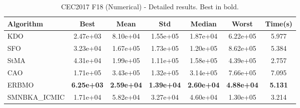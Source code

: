 \begin{table}[H]
\centering\small
\caption{CEC2017 F18 (Numerical) - Detailed results. Best in bold.}
\label{tab:cec2017_F18}
\begin{tabular}{lcccccc}
\toprule
\textbf{Algorithm} & \textbf{Best} & \textbf{Mean} & \textbf{Std} & \textbf{Median} & \textbf{Worst} & \textbf{Time(s)} \\
\midrule
KDO & 2.47e+03 & 8.10e+04 & 1.55e+05 & 1.87e+04 & 6.22e+05 & 5.977 \\
SFO & 3.23e+04 & 1.67e+05 & 1.73e+05 & 1.20e+05 & 8.62e+05 & 5.384 \\
StMA & 4.31e+04 & 1.99e+05 & 1.11e+05 & 1.58e+05 & 4.39e+05 & 2.757 \\
CAO & 1.71e+05 & 3.43e+05 & 1.32e+05 & 3.14e+05 & 7.66e+05 & 7.095 \\
ERBMO & \textbf{6.25e+03} & \textbf{2.59e+04} & \textbf{1.39e+04} & \textbf{2.60e+04} & \textbf{4.88e+04} & \textbf{5.131} \\
SMNBKA_ICMIC & 1.71e+04 & 5.82e+04 & 3.27e+04 & 4.60e+04 & 1.30e+05 & 3.214 \\
\bottomrule
\end{tabular}
\end{table}
